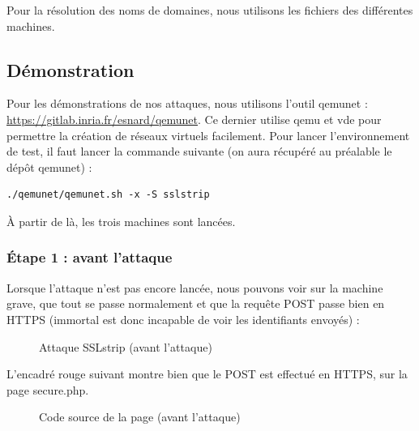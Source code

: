 Pour la résolution des noms de domaines, nous utilisons les fichiers  des différentes machines.

\subsection{Démonstration}

Pour les démonstrations de nos attaques, nous utilisons l'outil qemunet : \url{https://gitlab.inria.fr/esnard/qemunet}. Ce dernier utilise qemu et vde pour permettre la création de réseaux virtuels facilement.
Pour lancer l'environnement de test, il faut lancer la commande suivante (on aura récupéré au préalable le dépôt qemunet) :

\begin{verbatim}
./qemunet/qemunet.sh -x -S sslstrip
\end{verbatim}

À partir de là, les trois machines sont lancées.

\subsubsection{Étape 1 : avant l'attaque}

Lorsque l'attaque n'est pas encore lancée, nous pouvons voir sur la machine grave, que tout se passe normalement et que la requête POST passe bien en HTTPS (immortal est donc incapable de voir les identifiants envoyés) :

\begin{figure}[H]
  \caption{Attaque SSLstrip (avant l'attaque)}
\end{figure}

L'encadré rouge suivant montre bien que le POST est effectué en HTTPS, sur la page secure.php.

\begin{figure}[H]
  \caption{Code source de la page (avant l'attaque)}
\end{figure}

